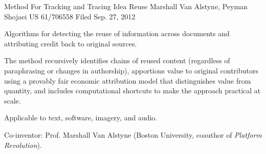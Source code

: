

\begin{cventries}

  \cventry
    {Method For Tracking and Tracing Idea Reuse} %
    {Marshall Van Alstyne, Peyman Shojaei} %
    {US 61/706558} %
    {Filed Sep. 27, 2012} %
    {
      \begin{cvitems}
        \item {Algorithms for detecting the reuse of information across documents and attributing credit back to original sources.}
        \item {The method recursively identifies chains of reused content (regardless of paraphrasing or changes in authorship), apportions value to original contributors using a provably fair economic attribution model that distinguishes value from quantity, and includes computational shortcuts to make the approach practical at scale.}
        \item {Applicable to text, software, imagery, and audio.}
        \item {Co-inventor: Prof. Marshall Van Alstyne (Boston University, coauthor of \emph{Platform Revolution}).}
      \end{cvitems}
    }

\end{cventries}
